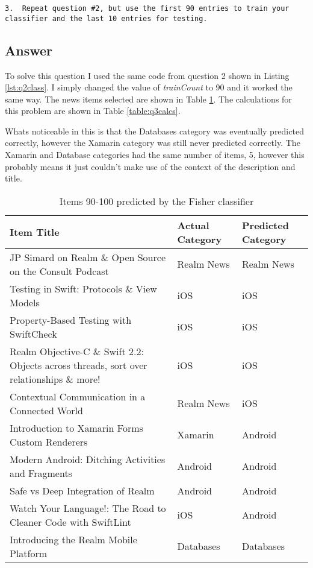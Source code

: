 \documentclass[letterpaper,11pt]{article}
\begin{document}
\begin{verbatim}
3.  Repeat question #2, but use the first 90 entries to train your
classifier and the last 10 entries for testing.
\end{verbatim}

\subsection*{Answer}

To solve this question I used the same code from question 2 shown in Listing \ref{lst:q2class}. I simply changed the value of \textit{trainCount} to 90 and it worked the same way. The news items selected are shown in Table \ref{table:q3classified}. The calculations for this problem are shown in Table \ref{table:q3calcs}. 

Whats noticeable in this is that the Databases category was eventually predicted correctly, however the Xamarin category was still never predicted correctly. The Xamarin and Database categories had the same number of items, 5, however this probably means it just couldn't make use of the context of the description and title.

\begin{table}[h]
\centering
\begin{adjustbox}{max width=\linewidth}
\begin{tabular}{ | l | l | l |}
\hline
\textbf{Item Title} & \textbf{Actual Category} & \textbf{Predicted Category} \\
\hline
JP Simard on Realm \& Open Source on the Consult Podcast & Realm News & Realm News \\ 
Testing in Swift: Protocols \& View Models & iOS & iOS \\ 
Property-Based Testing with SwiftCheck & iOS & iOS \\ 
Realm Objective-C \& Swift 2.2: Objects across threads, sort over relationships \& more! & iOS & iOS \\ 
Contextual Communication in a Connected World & Realm News & iOS \\ 
Introduction to Xamarin Forms Custom Renderers & Xamarin & Android \\ 
Modern Android: Ditching Activities and Fragments & Android & Android \\ 
Safe vs Deep Integration of Realm & Android & Android \\ 
Watch Your Language!: The Road to Cleaner Code with SwiftLint & iOS & Android \\ 
Introducing the Realm Mobile Platform & Databases & Databases \\ 
\hline
\end{tabular}
\end{adjustbox}
\caption{Items 90-100 predicted by the Fisher classifier}
\label{table:q3classified}
\end{table}
\end{document}
